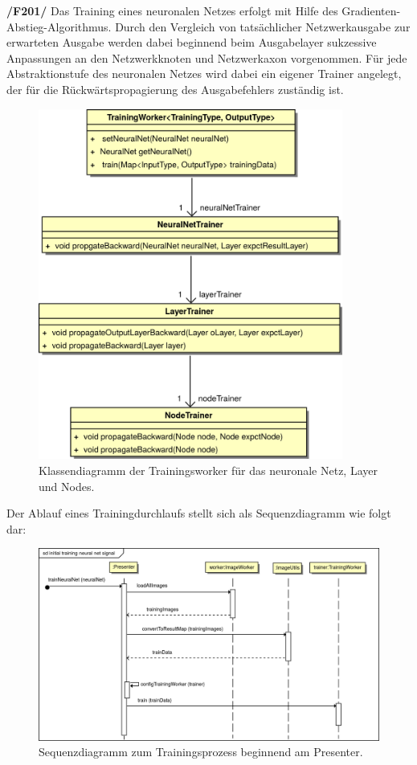 \textbf{/F201/} Das Training eines neuronalen Netzes erfolgt mit Hilfe des Gradienten-Abstieg-Algorithmus. Durch den Vergleich von tatsächlicher Netzwerkausgabe zur erwarteten Ausgabe werden dabei beginnend beim Ausgabelayer sukzessive Anpassungen an den Netzwerkknoten und Netzwerkaxon vorgenommen. Für jede Abstraktionstufe des neuronalen Netzes wird dabei ein eigener Trainer angelegt, der für die Rückwärtspropagierung des Ausgabefehlers zuständig ist.\\[-0.5cm]
\begin{figure}[H]
\begin{center}
\includegraphics[width=10cm]{Abbildungen/UML/jan/trainerCD.png}
\caption{Klassendiagramm der Trainingsworker für das neuronale Netz, Layer und Nodes.}
\label{fig_cdTraining}
\end{center}
\end{figure}
Der Ablauf eines Trainingdurchlaufs stellt sich als Sequenzdiagramm wie folgt dar:
\begin{figure}[H]
\begin{center}
\includegraphics[width=14.2cm]{Abbildungen/UML/jan/trainNeuralNet.png}
\caption{Sequenzdiagramm zum Trainingsprozess beginnend am Presenter.}
\label{fig_sdTraining}
\end{center}
\end{figure}
